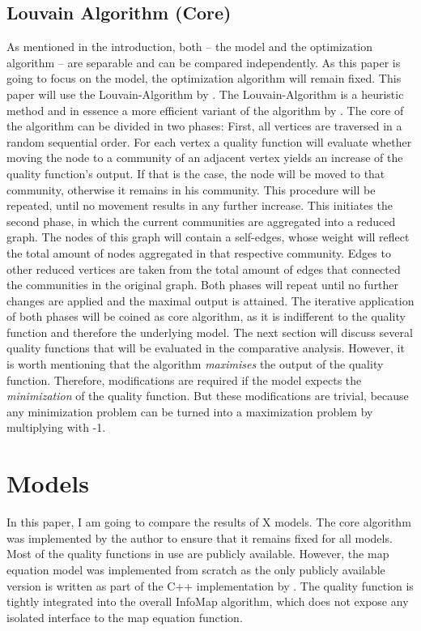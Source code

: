 \documentclass[11pt, twocolumn]{article}
\begin{document}
\subsection{Louvain Algorithm (Core)}
As mentioned in the introduction, both -- the model and the optimization algorithm -- are separable and can be compared independently. As this paper is going to focus on the model, the optimization algorithm will remain fixed. This paper will use the Louvain-Algorithm by \cite{blondel_FastUnfoldingCommunities_2008}. The Louvain-Algorithm is a heuristic method and in essence a more efficient variant of the algorithm by \citeauthor{clauset_FindingCommunityStructure_2004}. The core of the algorithm can be divided in two phases:\cite{waltman_SmartLocalMoving_2013} First, all vertices are traversed in a random sequential order. For each vertex a quality function will evaluate whether moving the node to a community of an adjacent vertex yields an increase of the quality function's output. If that is the case, the node will be moved to that community, otherwise it remains in his community. This procedure will be repeated, until no movement results in any further increase. This initiates the second phase, in which the current communities are aggregated into a reduced graph. The nodes of this graph will contain a self-edges, whose weight will reflect the total amount of nodes aggregated in that respective community. Edges to other reduced vertices are taken from the total amount of edges that connected the communities in the original graph. Both phases will repeat until no further changes are applied and the maximal output is attained. The iterative application of both phases will be coined as core algorithm, as it is indifferent to the quality function and therefore the underlying model. The next section will discuss several quality functions that will be evaluated in the comparative analysis. However, it is worth mentioning that the algorithm \emph{maximises} the output of the quality function. Therefore, modifications are required if the model expects the \emph{minimization} of the quality function. But these modifications are trivial, because any minimization problem can be turned into a maximization problem by multiplying with -1. 

\section{Models}
In this paper, I am going to compare the results of X models. The core algorithm was implemented by the author to ensure that it remains fixed for all models. Most of the quality functions in use are publicly available. However, the map equation model was implemented from scratch as the only publicly available version is written as part of the C++ implementation by \citeauthor{blondel_FastUnfoldingCommunities_2008}. The quality function is tightly integrated into the overall InfoMap algorithm, which does not expose any isolated interface to the map equation function. 
\end{document}
